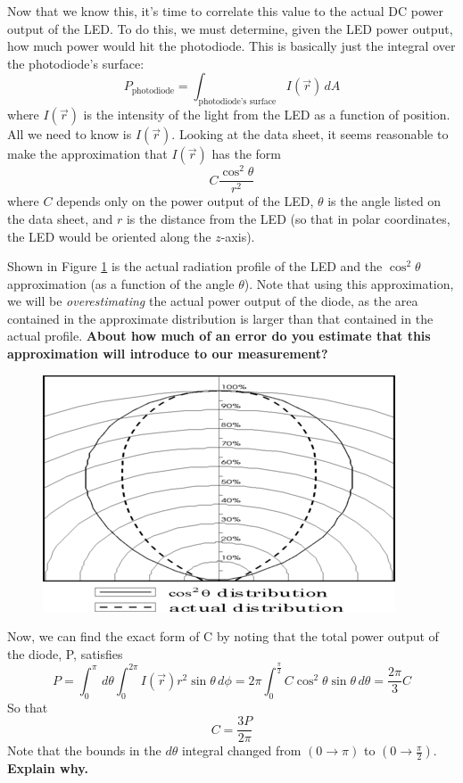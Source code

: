 \documentclass{../lab}
\begin{document}
Now that we know this, it's time to correlate this value to the actual DC power output of the LED. To do this, we must determine, given the LED power output, how much power would hit the photodiode. This is basically just the integral over the photodiode's surface:
\begin{equation}
    P_\text{photodiode} = \int_\text{photodiode's surface} I(\vec{r}) \,dA
\end{equation}
where $I(\vec{r})$ is the intensity of the light from the LED as a function of position. All we need to know is $I(\vec{r})$. Looking at the data sheet, it seems reasonable to make the approximation that $I(\vec{r})$ has the form
\begin{equation}
    C \frac{\cos^2{\theta}}{r^2}
\end{equation}
where $C$ depends only on the power output of the LED, $\theta$ is the angle listed on the data sheet, and $r$ is the distance from the LED (so that in polar coordinates, the LED would be oriented along the $z$-axis).

Shown in Figure \ref{fig:RadiationProfile} is the actual radiation profile of the LED and the $\cos^2\theta$ approximation (as a function of the angle $\theta$). Note that using this approximation, we will be \emph{overestimating} the actual power output of the diode, as the area contained in the approximate distribution is larger than that contained in the actual profile. \textbf{About how much of an error do you estimate that this approximation will introduce to our measurement?}


\begin{figure}[h]
    \centering
    \href{http://experimentationlab.berkeley.edu/sites/default/files/images/395px-Diode_Distribution.png}{\includegraphics[width=0.5\linewidth]{images/395px-Diode_Distribution.png}}
    \caption{}
    \label{fig:RadiationProfile}
\end{figure}

Now, we can find the exact form of C by noting that the total power output of the diode, P, satisfies
\begin{equation}
    P = \int_0^{\pi}\, d\theta \int_0^{2\pi}I(\vec{r})r^2\sin{\theta}\, d\phi
    = 2\pi\int_0^{\frac{\pi}{2}}C\cos^2{\theta}\sin{\theta}\, d\theta
    = \frac{2\pi}{3}C
\end{equation}
So that
\begin{equation}
    C = \frac{3P}{2\pi}
\end{equation}
Note that the bounds in the $d\theta$ integral changed from $(0\rightarrow\pi)$ to $(0\rightarrow\frac{\pi}{2})$. \textbf{Explain why.}
\end{document}
